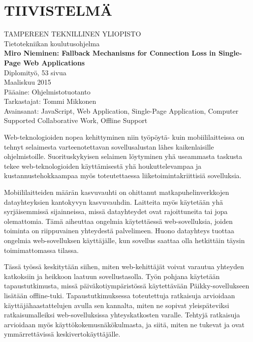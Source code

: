 \newpage
 
\setcounter{page}{1} %
 
\chapter*{TIIVISTELMÄ}
\begin{spacing}{1.0}
\textsf{TAMPEREEN TEKNILLINEN YLIOPISTO}\\
\textsf{Tietotekniikan koulutusohjelma}\\
{\bf \textsf{Miro Nieminen: Fallback Mechanisms for Connection Loss in Single-Page Web Applications}}\\
\textsf{Diplomityö, 53 sivua}\\
\textsf{Maaliskuu 2015}\\
\textsf{Pääaine: Ohjelmistotuotanto}\\
\textsf{Tarkastajat: Tommi Mikkonen}\\
\textsf{Avainsanat: JavaScript, Web Application, Single-Page Application, Computer Supported Collaborative Work, Offline Support}\\
\end{spacing}
 
Web-teknologioiden nopea kehittyminen niin työpöytä- kuin mobiililaitteissa on tehnyt selaimesta varteenotettavan sovellusalustan lähes kaikenlaisille ohjelmistoille. Suorituskykyisen selaimen löytyminen yhä useammasta taskusta tekee web-tek\-no\-lo\-gi\-oi\-den käyttämisestä yhä houkuttelevampaa ja kustannustehokkaampaa myös toteutettaessa liiketoimintakriittisiä sovelluksia.

Mobiililaitteiden määrän kasvuvauhti on ohittanut matkapuhelinverkkojen datayhteyksien kantokyvyn kasvuvauhdin. Laitteita myös käytetään yhä syrjäisemmissä sijainneissa, missä datayhteydet ovat rajoittuneita tai jopa olemattomia. Tämä aiheuttaa ongelmia käytettäessä web-sovelluksia, joiden toiminta on riippuvainen yhteydestä palvelimeen. Huono datayhteys tuottaa ongelmia web-sovelluksen käyttäjälle, kun sovellus saattaa olla hetkittäin täysin toimimattomassa tilassa.

Tässä työssä keskitytään siihen, miten web-kehittäjät voivat varautua yhteyden katkoksiin ja heikkoon laatuun sovellustasolla. Työn pohjana käytetään tapaustutkimusta, missä päiväkotiympäristössä käytettävään Päikky-sovellukseen lisätään offline-tuki. Tapaustutkimuksessa toteutettuja ratkaisuja arvioidaan käyttäjähaastattelujen avulla sen kannalta, miten ne sopivat yleispäteviksi ratkaisumalleiksi web-sovelluksissa yhteyskatkosten varalle. Tehtyjä ratkaisuja arvioidaan myös käyttökokemusnäkökulmasta, ja siitä, miten ne tukevat ja ovat ymmärrettävissä keskivertokäyttäjälle.

